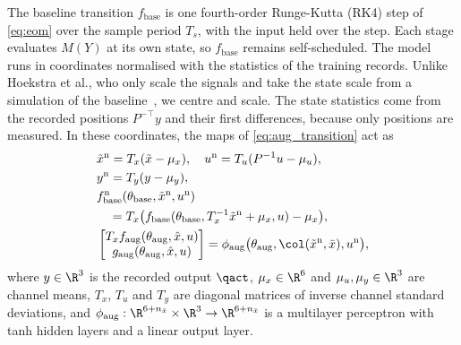 The baseline transition $f_{\mathrm{base}}$ is one fourth-order Runge-Kutta
(RK4) step of \eqref{eq:eom} over the sample period $T_s$, with the input held
over the step.
Each stage evaluates $M(Y)$ at its own state, so $f_{\mathrm{base}}$ remains
self-scheduled.
The model runs in coordinates normalised with the statistics of the training
records.
Unlike Hoekstra et al., who only scale the signals and take the state scale
from a simulation of the baseline~\cite[Sec.~5.3]{hoekstra2026lfr}, we centre
and scale.
The state statistics come from the recorded positions $P^{-\top}y$ and their
first differences, because only positions are measured.
In these coordinates, the maps of \eqref{eq:aug_transition} act as
\begin{equation}
\begin{aligned}
 &\tilde x^{\mathrm n}=T_x(\tilde x-\mu_x),\quad
  u^{\mathrm n}=T_u(P^{-1}u-\mu_u),\\
 &y^{\mathrm n}=T_y(y-\mu_y),\\
 &f^{\mathrm n}_{\mathrm{base}}(\theta_{\mathrm{base}},\tilde x^{\mathrm n},u^{\mathrm n})\\
 &\quad=T_x\bigl(f_{\mathrm{base}}(\theta_{\mathrm{base}},T_x^{-1}\tilde x^{\mathrm n}+\mu_x,u)-\mu_x\bigr),\\
 &\begin{bmatrix}T_xf_{\mathrm{aug}}(\theta_{\mathrm{aug}},\hat x,u)\\
   g_{\mathrm{aug}}(\theta_{\mathrm{aug}},\hat x,u)\end{bmatrix}
  =\phi_{\mathrm{aug}}\bigl(\theta_{\mathrm{aug}},\col(\tilde x^{\mathrm n},\bar x),u^{\mathrm n}\bigr),
\end{aligned}
\label{eq:aug_norm}
\end{equation}
where $y\in\R^3$ is the recorded output $\qact$, $\mu_x\in\R^6$ and
$\mu_u,\mu_y\in\R^3$ are channel means, $T_x$, $T_u$ and $T_y$ are diagonal
matrices of inverse channel standard deviations, and
$\phi_{\mathrm{aug}}:\R^{6+n_{\bar x}}\times\R^3\to\R^{6+n_{\bar x}}$ is a
multilayer perceptron with tanh hidden layers and a linear output layer.

